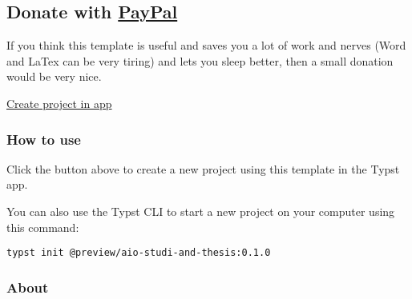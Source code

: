 \begin{Shaded}
\begin{Highlighting}[]

\NormalTok{  ),}
\NormalTok{  )}
\NormalTok{)}
\end{Highlighting}
\end{Shaded}

\subsection{\texorpdfstring{Donate with
\href{https://www.paypal.com/donate/?hosted_button_id=4G9X8TDNYYNKG}{PayPal}}{Donate with PayPal}}\label{donate-with-paypal}

If you think this template is useful and saves you a lot of work and
nerves (Word and LaTex can be very tiring) and lets you sleep better,
then a small donation would be very nice.

\href{https://www.paypal.com/donate/?hosted_button_id=4G9X8TDNYYNKG}{}

\href{/app?template=aio-studi-and-thesis&version=0.1.0}{Create project
in app}

\subsubsection{How to use}\label{how-to-use}

Click the button above to create a new project using this template in
the Typst app.

You can also use the Typst CLI to start a new project on your computer
using this command:

\begin{verbatim}
typst init @preview/aio-studi-and-thesis:0.1.0
\end{verbatim}



\subsubsection{About}\label{about}

